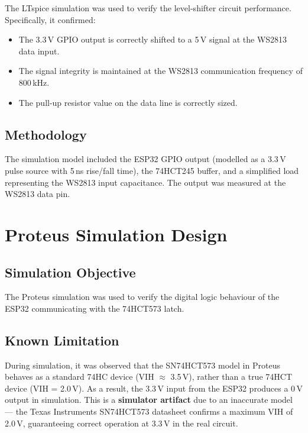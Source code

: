 The LTspice simulation was used to verify the level-shifter circuit performance. Specifically, it confirmed:

\begin{itemize}
  \item The 3.3\,V GPIO output is correctly shifted to a 5\,V signal at the WS2813 data input.
  \item The signal integrity is maintained at the WS2813 communication frequency of 800\,kHz.
  \item The pull-up resistor value on the data line is correctly sized.
\end{itemize}

\subsection{Methodology}
\label{sec:ltspice-method}

The simulation model included the ESP32 GPIO output (modelled as a 3.3\,V pulse source with 5\,ns rise/fall time), the 74HCT245 buffer, and a simplified load representing the WS2813 input capacitance. The output was measured at the WS2813 data pin.

\section{Proteus Simulation Design}
\label{sec:proteus-design}

\subsection{Simulation Objective}
\label{sec:proteus-objective}

The Proteus simulation was used to verify the digital logic behaviour of the ESP32 communicating with the 74HCT573 latch.

\subsection{Known Limitation}
\label{sec:proteus-limitation}

During simulation, it was observed that the SN74HCT573 model in Proteus behaves as a standard 74HC device (VIH $\approx$ 3.5\,V), rather than a true 74HCT device (VIH = 2.0\,V). As a result, the 3.3\,V input from the ESP32 produces a 0\,V output in simulation. This is a \textbf{simulator artifact} due to an inaccurate model --- the Texas Instruments SN74HCT573 datasheet\cite{sn74hct573_ds} confirms a maximum VIH of 2.0\,V, guaranteeing correct operation at 3.3\,V in the real circuit.
